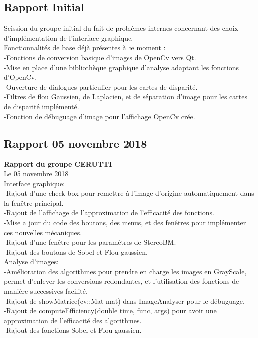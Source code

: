 \documentclass{article}
\begin{document}
\subsection{Rapport Initial}
Scission du groupe initial du fait de problèmes internes concernant des choix d'implémentation de l'interface graphique.\\

Fonctionnalités de base déjà présentes à ce moment :\\
	-Fonctions de conversion basique d'images de OpenCv vers Qt.\\
	-Mise en place d'une bibliothèque graphique d'analyse adaptant les fonctions d'OpenCv.\\
	-Ouverture de dialogues particulier pour les cartes de disparité.\\
	-Filtres de flou Gaussien, de Laplacien, et de séparation d'image pour les cartes de disparité implémenté.\\
	-Fonction de débuguage d'image pour l'affichage OpenCv crée.\\


\subsection{Rapport 05 novembre 2018}

\textbf{Rapport du groupe CERUTTI}\\
Le 05 novembre 2018\\

Interface graphique:\\
	-Rajout d'une check box pour remettre à l'image d'origine automatiquement dans la fenêtre principal.\\
	-Rajout de l'affichage de l'approximation de l'efficacité des fonctions.\\
	-Mise a jour du code des boutons, des menus, et des fenêtres pour implémenter ces nouvelles mécaniques.\\
	-Rajout d'une fenêtre pour les paramètres de StereoBM.\\
	-Rajout des boutons de Sobel et Flou gaussien.
\\
	
Analyse d'images:\\
	-Amélioration des algorithmes pour prendre en charge les images en GrayScale, permet d'enlever les conversions redondantes, et l'utilisation des fonctions de manière successives facilité.\\
	-Rajout de showMatrice(cv::Mat mat) dans ImageAnalyser pour le débuguage.\\
	-Rajout de computeEfficiency(double time, func, args) pour avoir une approximation de l'efficacité des algorithmes.\\
	-Rajout des fonctions Sobel et Flou gaussien.\\
\end{document}
